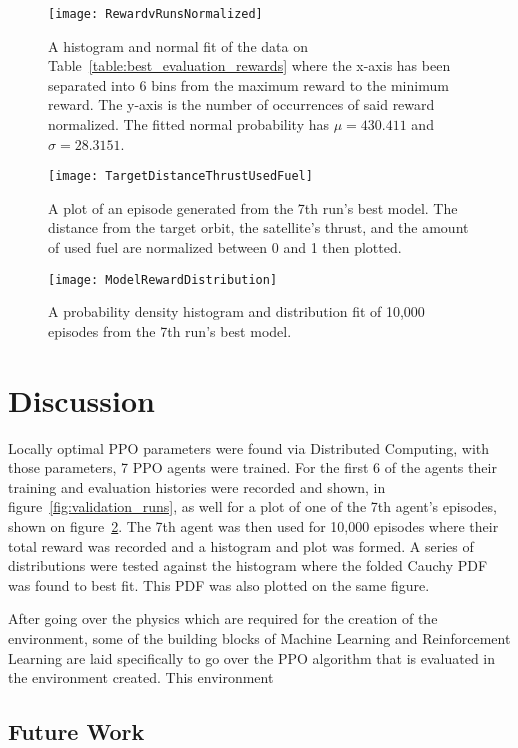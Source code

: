 \begin{figure}
	\centering
	\texttt{[image: RewardvRunsNormalized]}
	\caption{A histogram and normal fit of the data on Table~\ref{table:best_evaluation_rewards} where the x-axis has been separated into 6 bins from the maximum reward to the minimum reward. The y-axis is the number of occurrences of said reward normalized. The fitted normal probability has $\mu=430.411$ and $\sigma=28.3151$.}
	\label{fig:norm_hist_reward}
\end{figure}

\begin{figure}
	\centering
	\texttt{[image: TargetDistanceThrustUsedFuel]}
	\caption{A plot of an episode generated from the 7th run's best model. The distance from the target orbit, the satellite's thrust, and the amount of used fuel are normalized between 0 and 1 then plotted.}
	\label{fig:tdtuf}
\end{figure}

\begin{figure}
	\centering
	\texttt{[image: ModelRewardDistribution]}
	\caption{A probability density histogram and distribution fit of 10,000 episodes from the 7th run's best model.}
	\label{fig:model_reward_distribution}
\end{figure}

\section{Discussion}

Locally optimal PPO parameters were found via Distributed Computing, with those parameters, 7 PPO agents were trained. For the first 6 of the agents their training and evaluation histories were recorded and shown, in figure~\ref{fig:validation_runs}, as well for a plot of one of the 7th agent's episodes, shown on figure~\ref{fig:tdtuf}. The 7th agent was then used for 10,000 episodes where their total reward was recorded and a histogram and plot was formed. A series of distributions were tested against the histogram where the folded Cauchy PDF was found to best fit. This PDF was also plotted on the same figure. 

After going over the physics which are required for the creation of the environment, some of the building blocks of Machine Learning and Reinforcement Learning are laid specifically to go over the PPO algorithm that is evaluated in the environment created. This environment 

\subsection{Future Work}